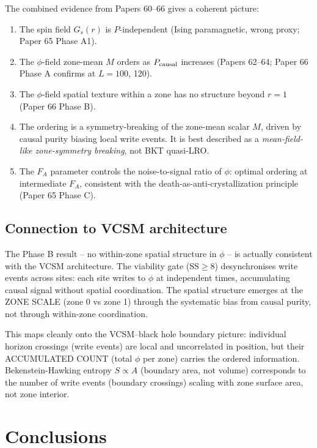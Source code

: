 \documentclass[12pt,a4paper]{article}
\begin{document}
The combined evidence from Papers 60--66 gives a coherent picture:

\begin{enumerate}
\item The spin field $G_s(r)$ is $P$-independent (Ising paramagnetic, wrong proxy;
  Paper 65 Phase A1).
\item The $\phi$-field zone-mean $M$ orders as $P_{\rm causal}$ increases
  (Papers 62--64; Paper 66 Phase A confirms at $L=100$, 120).
\item The $\phi$-field spatial texture within a zone has no structure beyond
  $r=1$ (Paper 66 Phase B).
\item The ordering is a symmetry-breaking of the zone-mean scalar $M$,
  driven by causal purity biasing local write events.
  It is best described as a \emph{mean-field-like zone-symmetry breaking},
  not BKT quasi-LRO.
\item The $F_A$ parameter controls the noise-to-signal ratio of $\phi$:
  optimal ordering at intermediate $F_A$, consistent with the
  death-as-anti-crystallization principle (Paper 65 Phase C).
\end{enumerate}

\subsection{Connection to VCSM architecture}

The Phase B result -- no within-zone spatial structure in $\phi$ --
is actually consistent with the VCSM architecture.
The viability gate ($\mathrm{SS} \ge 8$) desynchronises write events
across sites: each site writes to $\phi$ at independent times,
accumulating causal signal without spatial coordination.
The spatial structure emerges at the ZONE SCALE (zone 0 vs zone 1)
through the systematic bias from causal purity, not through
within-zone coordination.

This maps cleanly onto the VCSM--black hole boundary picture:
individual horizon crossings (write events) are local and uncorrelated
in position, but their ACCUMULATED COUNT (total $\phi$ per zone)
carries the ordered information.
Bekenstein-Hawking entropy $S \propto A$ (boundary area, not volume)
corresponds to the number of write events (boundary crossings)
scaling with zone surface area, not zone interior.

\section{Conclusions}
\end{document}
